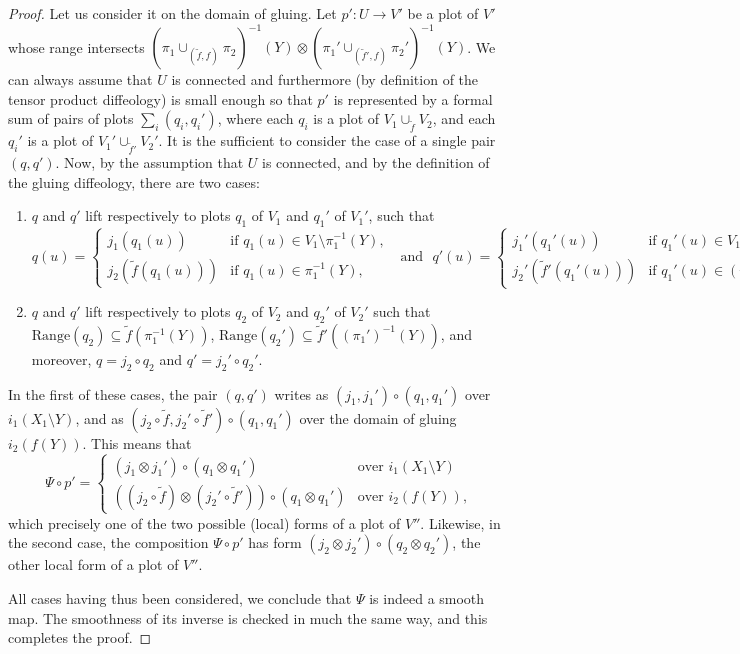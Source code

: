 \documentclass{article}
\begin{document}
\begin{proof}
Let us consider it on the domain of gluing. Let $p':U\to V'$ be a plot of $V'$ whose range intersects $(\pi_1\cup_{(\tilde{f},f)}\pi_2)^{-1}(Y)\otimes(\pi_1'\cup_{(\tilde{f}',f)}\pi_2')^{-1}(Y)$. We can always assume 
that $U$ is connected and furthermore (by definition of the tensor product diffeology) is small enough so that $p'$ is represented by a formal sum of pairs of plots $\sum_i(q_i,q_i')$, where each $q_i$ is a plot 
of $V_1\cup_{\tilde{f}}V_2$, and each $q_i'$ is a plot of $V_1'\cup_{\tilde{f}'}V_2'$. It is the sufficient to consider the case of a single pair $(q,q')$. Now, by the assumption that $U$ is connected, and by the 
definition of the gluing diffeology, there are two cases:
\begin{enumerate}
\item $q$ and $q'$ lift respectively to plots $q_1$ of $V_1$ and $q_1'$ of $V_1'$, such that 
$$q(u)=\left\{\begin{array}{ll} j_1(q_1(u)) & \mbox{if }q_1(u)\in V_1\setminus\pi_1^{-1}(Y), \\ j_2(\tilde{f}(q_1(u))) & \mbox{if } q_1(u)\in\pi_1^{-1}(Y), \end{array}\right.\,\,\mbox{ and }\,\, 
q'(u)=\left\{\begin{array}{ll} j_1'(q_1'(u)) & \mbox{if }q_1'(u)\in V_1'\setminus(\pi_1')^{-1}(Y), \\ j_2'(\tilde{f}'(q_1'(u))) & \mbox{if } q_1'(u)\in(\pi_1')^{-1}(Y), \end{array}\right.;$$
\item $q$ and $q'$ lift respectively to plots $q_2$ of $V_2$ and $q_2'$ of $V_2'$ such that $\mbox{Range}(q_2)\subseteq\tilde{f}(\pi_1^{-1}(Y))$, $\mbox{Range}(q_2')\subseteq\tilde{f}'((\pi_1')^{-1}(Y))$, 
and moreover, $q=j_2\circ q_2$ and $q'=j_2'\circ q_2'$.
\end{enumerate}
In the first of these cases, the pair $(q,q')$ writes as $(j_1,j_1')\circ(q_1,q_1')$ over $i_1(X_1\setminus Y)$, and as $(j_2\circ\tilde{f},j_2'\circ\tilde{f}')\circ(q_1,q_1')$ over the domain of gluing $i_2(f(Y))$. This 
means that 
$$\Psi\circ p'=
\left\{\begin{array}{ll} (j_1\otimes j_1')\circ(q_1\otimes q_1') & \mbox{over }i_1(X_1\setminus Y) \\ ((j_2\circ\tilde{f})\otimes(j_2'\circ\tilde{f}'))\circ(q_1\otimes q_1') & \mbox{over }i_2(f(Y)), \end{array}\right.$$ which 
precisely one of the two possible (local) forms of a plot of $V''$. Likewise, in the second case, the composition $\Psi\circ p'$ has form $(j_2\otimes j_2')\circ(q_2\otimes q_2')$, the other local form of a plot of 
$V''$. 

All cases having thus been considered, we conclude that $\Psi$ is indeed a smooth map. The smoothness of its inverse is checked in much the same way, and this completes the proof.
\end{proof}
\end{document}
